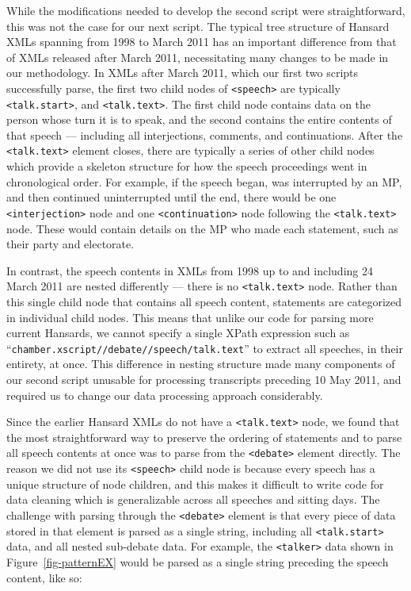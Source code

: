 \documentclass[
  letterpaper,
  DIV=11,
  numbers=noendperiod]{scrartcl}
\begin{document}
While the modifications needed to develop the second script were
straightforward, this was not the case for our next script. The typical
tree structure of Hansard XMLs spanning from 1998 to March 2011 has an
important difference from that of XMLs released after March 2011,
necessitating many changes to be made in our methodology. In XMLs after
March 2011, which our first two scripts successfully parse, the first
two child nodes of \texttt{\textless{}speech\textgreater{}} are
typically \texttt{\textless{}talk.start\textgreater{}}, and
\texttt{\textless{}talk.text\textgreater{}}. The first child node
contains data on the person whose turn it is to speak, and the second
contains the entire contents of that speech --- including all
interjections, comments, and continuations. After the
\texttt{\textless{}talk.text\textgreater{}} element closes, there are
typically a series of other child nodes which provide a skeleton
structure for how the speech proceedings went in chronological order.
For example, if the speech began, was interrupted by an MP, and then
continued uninterrupted until the end, there would be one
\texttt{\textless{}interjection\textgreater{}} node and one
\texttt{\textless{}continuation\textgreater{}} node following the
\texttt{\textless{}talk.text\textgreater{}} node. These would contain
details on the MP who made each statement, such as their party and
electorate.

In contrast, the speech contents in XMLs from 1998 up to and including
24 March 2011 are nested differently --- there is no
\texttt{\textless{}talk.text\textgreater{}} node. Rather than this
single child node that contains all speech content, statements are
categorized in individual child nodes. This means that unlike our code
for parsing more current Hansards, we cannot specify a single XPath
expression such as
``\texttt{chamber.xscript//debate//speech/talk.text}'' to extract all
speeches, in their entirety, at once. This difference in nesting
structure made many components of our second script unusable for
processing transcripts preceding 10 May 2011, and required us to change
our data processing approach considerably.

Since the earlier Hansard XMLs do not have a
\texttt{\textless{}talk.text\textgreater{}} node, we found that the most
straightforward way to preserve the ordering of statements and to parse
all speech contents at once was to parse from the
\texttt{\textless{}debate\textgreater{}} element directly. The reason we
did not use its \texttt{\textless{}speech\textgreater{}} child node is
because every speech has a unique structure of node children, and this
makes it difficult to write code for data cleaning which is
generalizable across all speeches and sitting days. The challenge with
parsing through the \texttt{\textless{}debate\textgreater{}} element is
that every piece of data stored in that element is parsed as a single
string, including all \texttt{\textless{}talk.start\textgreater{}} data,
and all nested sub-debate data. For example, the
\texttt{\textless{}talker\textgreater{}} data shown in
Figure~\ref{fig-patternEX} would be parsed as a single string preceding
the speech content, like so:
\end{document}
